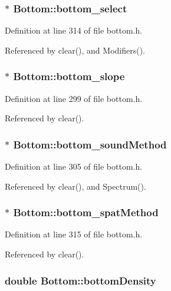 \subsubsection{$\ast$ {\bf Bottom::bottom\_\-select}}\label{classBottom_o16}




Definition at line 314 of file bottom.h.

Referenced by clear(), and Modifiers().
\subsubsection{$\ast$ {\bf Bottom::bottom\_\-slope}}\label{classBottom_o1}




Definition at line 299 of file bottom.h.

Referenced by clear().
\subsubsection{$\ast$ {\bf Bottom::bottom\_\-sound\-Method}}\label{classBottom_o7}




Definition at line 305 of file bottom.h.

Referenced by clear(), and Spectrum().
\subsubsection{$\ast$ {\bf Bottom::bottom\_\-spat\-Method}}\label{classBottom_o17}




Definition at line 315 of file bottom.h.

Referenced by clear().
\subsubsection{\setlength{\rightskip}{0pt plus 5cm}double {\bf Bottom::bottom\-Density}\hspace{0.3cm}{\tt  [private]}}\label{classBottom_r0}


